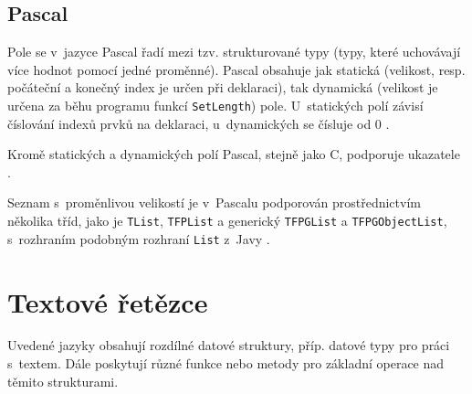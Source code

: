 \documentclass[onepage, a4paper, 12pt]{bakalarka}
\begin{document}
\subsection{Pascal}
Pole se v~jazyce Pascal řadí mezi tzv. strukturované typy (typy, které uchovávají více hodnot pomocí jedné proměnné). Pascal obsahuje jak statická (velikost, resp. počáteční a konečný index je určen při deklaraci), tak dynamická (velikost je určena za běhu programu funkcí \texttt{SetLength}) pole. U~statických polí závisí číslování indexů prvků na deklaraci, u~dynamických se čísluje od 0 \cite{pas-guide-structured-types, pas-guide-static-array, pas-guide-dynamic-array}.\par\noindent
Kromě statických a dynamických polí Pascal, stejně jako C, podporuje ukazatele \cite{pas-guide-pointer}.\par
Seznam s~proměnlivou velikostí je v~Pascalu podporován prostřednictvím několika tříd, jako je \texttt{TList}, \texttt{TFPList} a generický \texttt{TFPGList} a \texttt{TFPGObjectList}, s~rozhraním podobným rozhraní \texttt{List} z~Javy \cite{pas-guide-tlist, pas-guide-tfplist, pas-guide-tfpglist, pas-guide-tfpgobjectlist}.

\section{Textové řetězce}\label{sec:strings}
Uvedené jazyky obsahují rozdílné datové struktury, příp. datové typy pro práci s~textem. Dále poskytují různé funkce nebo metody pro základní operace nad těmito strukturami.
\end{document}
